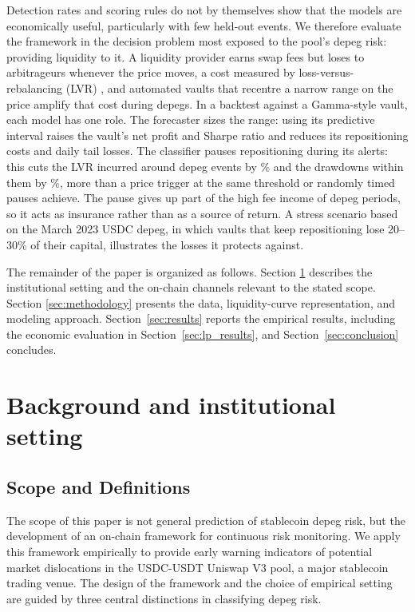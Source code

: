\documentclass[a4paper,fleqn]{cas-sc}
\begin{document}
Detection rates and scoring rules do not by themselves show that the models are economically useful,
particularly with few held-out events. We therefore evaluate the framework in the decision problem most
exposed to the pool's depeg risk: providing liquidity to it. A liquidity provider earns swap fees but loses
to arbitrageurs whenever the price moves, a cost measured by loss-versus-rebalancing (LVR)
\citep{Milionis2022}, and automated vaults that recentre a narrow range on the price amplify that cost
during depegs. In a backtest against a Gamma-style vault, each model has one role. The forecaster sizes the
range: using its predictive interval raises the vault's net profit and Sharpe ratio and reduces its
repositioning costs and daily tail losses. The classifier pauses repositioning during its alerts: this
cuts the LVR incurred around depeg events by \lpFcKEvLVRCut\% and the drawdowns within them by
\lpFcKEventDDCut\%, more than a price trigger at the same threshold or randomly timed pauses achieve. The
pause gives up part of the high fee income of depeg periods, so it acts as insurance rather than as a source
of return. A stress scenario based on the March 2023 USDC depeg, in which vaults that keep repositioning lose
20--30\% of their capital, illustrates the losses it protects against.

The remainder of the paper is organized as follows. Section \ref{sec:background} describes the institutional setting and the on-chain channels relevant to the stated scope. Section \ref{sec:methodology} presents the data, liquidity-curve representation, and modeling approach. Section~\ref{sec:results} reports the empirical results, including the economic evaluation in Section~\ref{sec:lp_results}, and Section~\ref{sec:conclusion} concludes.


\section{Background and institutional setting}
\label{sec:background}
\subsection{Scope and Definitions}

The scope of this paper is not general prediction of stablecoin depeg risk, but the development of an on-chain framework for continuous risk monitoring. We apply this framework empirically to provide early warning indicators of potential market dislocations in the USDC-USDT Uniswap V3 pool, a major stablecoin trading venue. The design of the framework and the choice of empirical setting are guided by three central distinctions in classifying depeg risk.
\end{document}
